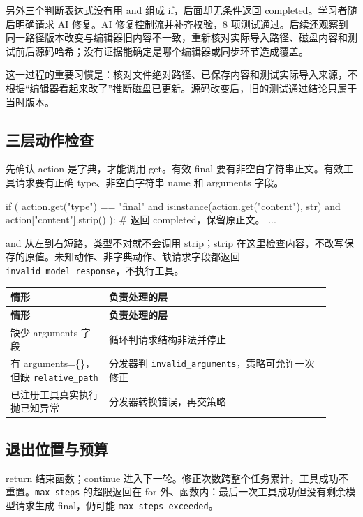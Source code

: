 另外三个判断表达式没有用 and 组成 if，后面却无条件返回 completed。学习者随后明确请求 AI 修复。AI 修复控制流并补齐校验，8 项测试通过。后续还观察到同一路径版本改变与编辑器旧内容不一致，重新核对实际导入路径、磁盘内容和测试前后源码哈希；没有证据能确定是哪个编辑器或同步环节造成覆盖。

这一过程的重要习惯是：核对文件绝对路径、已保存内容和测试实际导入来源，不根据“编辑器看起来改了”推断磁盘已更新。源码改变后，旧的测试通过结论只属于当时版本。

\subsection{三层动作检查}

先确认 action 是字典，才能调用 get。有效 final 要有非空白字符串正文。有效工具请求要有正确 type、非空白字符串 name 和 arguments 字段。

\begin{Code}
if (
    action.get("type") == "final"
    and isinstance(action.get("content"), str)
    and action["content"].strip()
):
    # 返回 completed，保留原正文。
    ...
\end{Code}

and 从左到右短路，类型不对就不会调用 strip；strip 在这里检查内容，不改写保存的原值。未知动作、非字典动作、缺请求字段都返回 \nolinkurl{invalid_model_response}，不执行工具。

{\small\setlength{\tabcolsep}{4pt}
\renewcommand{\arraystretch}{1.25}
\begin{longtable}{>{\raggedright\arraybackslash}p{0.28\linewidth}>{\raggedright\arraybackslash}p{0.63\linewidth}}
\toprule
\textbf{情形} & \textbf{负责处理的层} \\
\midrule\endfirsthead
\toprule
\textbf{情形} & \textbf{负责处理的层} \\
\midrule\endhead
\bottomrule\endfoot
缺少 arguments 字段 & 循环判请求结构非法并停止 \\
有 arguments=\{\}，但缺 \nolinkurl{relative_path} & 分发器判 \nolinkurl{invalid_arguments}，策略可允许一次修正 \\
已注册工具真实执行抛已知异常 & 分发器转换错误，再交策略 \\
\end{longtable}}

\subsection{退出位置与预算}

return 结束函数；continue 进入下一轮。修正次数跨整个任务累计，工具成功不重置。\nolinkurl{max_steps} 的超限返回在 for 外、函数内：最后一次工具成功但没有剩余模型请求生成 final，仍可能 \nolinkurl{max_steps_exceeded}。

